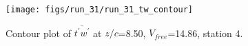 \begin{figure}[H]
\centering
\texttt{[image: figs/run\_31/run\_31\_tw\_contour]}
\caption{Contour plot of $\overline{t^\prime w^\prime}$ at $z/c$=8.50, $V_{free}$=14.86, station 4.}
\label{fig:run_31_tw_contour}
\end{figure}


